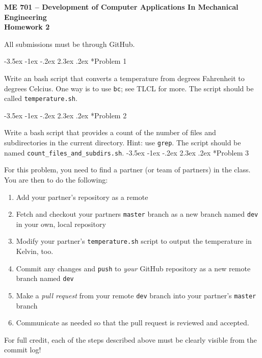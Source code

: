 \documentclass[11pt]{article}
\makeatletter
\renewcommand\section{\@startsection{section}{1}{\z@}%
                                  {-3.5ex \@plus -1ex \@minus -.2ex}%
                                  {2.3ex \@plus.2ex}%
                                  {\normalfont\bfseries}}
\makeatother
\begin{document}
{\large
  \begin{center}
    {\bf ME 701 -- Development of Computer Applications In Mechanical Engineering \\ 
         Homework 2 }         
  \end{center}
}
 
All submissions must be through GitHub.


\section*{Problem 1}

Write an bash script that converts a temperature from degrees Fahrenheit to degrees Celcius. 
One way is to use {\tt bc}; see TLCL for more.  
The script should be called {\tt temperature.sh}.

\section*{Problem 2}
 
Write a bash script that provides a count of the number of files and subdirectories in the current directory. 
Hint: use {\tt grep}.
The script should be named {\tt count\_files\_and\_subdirs.sh}.
\section*{Problem 3}

For this problem, you need to find a partner (or team of partners) in the class.  
You are then to do the following:
\begin{enumerate}
 \item Add your partner's repository as a remote
 \item Fetch and checkout your partners {\tt master} branch as a new branch named {\tt dev} in your own, local repository
 \item Modify your partner's {\tt  temperature.sh} script to output the temperature in Kelvin, too.
 \item Commit any changes and {\tt push} to {\it your} GitHub repository as a new remote branch named {\tt dev}
 \item Make a {\it pull request} from your remote {\tt dev} branch into your partner's {\tt master} branch
 \item Communicate as needed so that the pull request is reviewed and accepted.
\end{enumerate}
For full credit, each of the steps described above must be clearly visible from the commit log!
\end{document}

